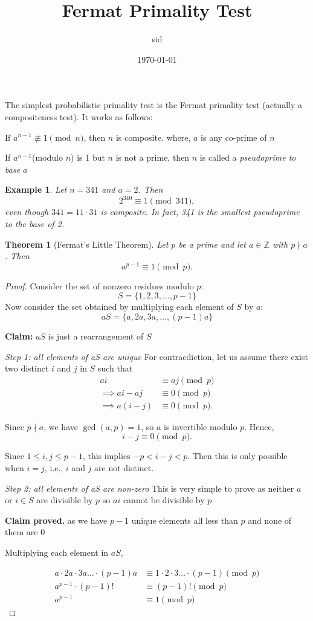 \documentclass{article}
\title{Fermat Primality Test}
\author{sid}
\date{\today}
\newtheorem{theorem}{Theorem}
\newtheorem{example}{Example}
\newcommand{\bld}[1]{\textbf{#1}}
\newcommand{\itl}[1]{\textit{#1}}
\begin{document}
\maketitle
The simplest probabilistic primality test is the Fermat primality test (actually a compositeness test). It works as follows:

\vspace{1em}
If $a^{n-1} \not\equiv 1 \pmod{n}$, then $n$ is composite.
where, $a$ is any co-prime of $n$

If $a^{n-1}$(modulo $n$) is 1 but $n$ is not a prime, then $n$ is called a \itl{pseudoprime to base $a$}
\begin{example}
  Let $n = 341$ and $a = 2$. Then
  \[
  2^{340} \equiv 1 \pmod{341},
  \]
  even though $341 = 11 \cdot 31$ is composite.
  In fact, 341 is the smallest pseudoprime to the base of 2.
\end{example}

\begin{theorem}[Fermat's Little Theorem]
Let $p$ be a prime and let $a \in \mathbb{Z}$ with $p \nmid a$. Then
\[
a^{p-1} \equiv 1 \pmod{p}.
\]
\end{theorem}

\begin{proof}
Consider the set of nonzero residues modulo $p$:
\[
S = \{1,2,3,\dots,p-1\}
\]
Now consider the set obtained by multiplying each element of $S$ by $a$:
\[
aS = \{a,2a,3a,\dots,(p-1)a\}
\]

\bld{Claim:} $aS$ is just a rearrangement of $S$

\itl{Step 1: all elements of aS are unique}
For contracdiction, let us assume there exist two distinct $i$ and $j$ in $S$ such that
\[
\begin{aligned}
ai &\equiv aj \pmod{p} \\
\implies ai - aj &\equiv 0 \pmod{p} \\
\implies a(i - j) &\equiv 0 \pmod{p}.
\end{aligned}
\]

Since $p \nmid a$, we have $\gcd(a,p)=1$, so $a$ is invertible modulo $p$. Hence,
\[
i - j \equiv 0 \pmod{p}.
\]

Since $1 \le i,j \le p-1$, this implies $-p<i-j<p$. Then this is only possible when $i=j$, i.e., $i$ and $j$ are not distinct.

\itl{Step 2: all elements of aS are non-zero}
This is very simple to prove as neither $a$ or $i\in S$ are divisible by $p$ so $ai$ cannot be divisible by $p$

\bld{Claim proved.} as we have $p-1$ unique elements all less than $p$ and none of them are 0

Multiplying each element in $aS$,

\[
\begin{aligned}
  a\cdot2a\cdot3a\dots\cdot{(p-1)a} &\equiv 1\cdot2\cdot3\dots\cdot{(p-1)} \pmod p \\
  a^{p-1}\cdot(p-1)! &\equiv  (p-1)! \pmod p \\
  a^{p-1}&\equiv  1\pmod p
\end{aligned}
\]
\end{proof}
\end{document}
